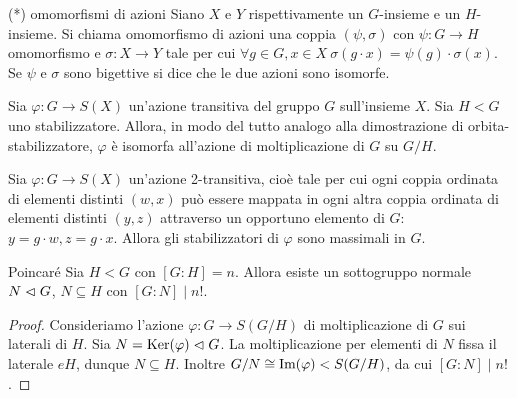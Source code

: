 \begin{definition}{(*) omomorfismi di azioni}
    Siano $X$ e $Y$ rispettivamente un $G$-insieme e un $H$-insieme. Si chiama omomorfismo di azioni una coppia $(\psi, \sigma)$ con $\psi : G \to H$ omomorfismo e $\sigma : X \to Y$ tale per cui $\forall g \in G, x \in X \ \sigma(g \cdot x) = \psi(g) \cdot \sigma(x)$. Se $\psi$ e $\sigma$ sono bigettive si dice che le due azioni sono isomorfe.
\end{definition}
\begin{proposition2}
    Sia $\varphi : G \to S(X)$ un'azione transitiva del gruppo $G$ sull'insieme $X$. Sia $H < G$ uno stabilizzatore. Allora, in modo del tutto analogo alla dimostrazione di orbita-stabilizzatore, $\varphi$ è isomorfa all'azione di moltiplicazione di $G$ su $G/H$.
\end{proposition2}
\begin{exercise}
    Sia $\varphi : G \to S(X)$ un'azione 2-transitiva, cioè tale per cui ogni coppia ordinata di elementi distinti $(w, x)$ può essere mappata in ogni altra coppia ordinata di elementi distinti $(y, z)$ attraverso un opportuno elemento di $G$: $y = g\cdot w, z = g\cdot x$. Allora gli stabilizzatori di $\varphi$ sono massimali in $G$.
\end{exercise}
\begin{theorem}{Poincaré}
    Sia $H < G$ con $[G : H] = n$. Allora esiste un sottogruppo normale $N \vartriangleleft G$, $N \subseteq H$ con $[G : N] \mid n!$.
\end{theorem}
\begin{proof}
    Consideriamo l'azione $\varphi : G \to S(G / H)$ di moltiplicazione di $G$ sui laterali di $H$. Sia $N = \text{Ker}(\varphi) \vartriangleleft G$. La moltiplicazione per elementi di $N$ fissa il laterale $eH$, dunque $N \subseteq H$. Inoltre $G / N \cong \text{Im}(\varphi) < S(G / H)$, da cui $[G : N] \mid n!$.
\end{proof}

